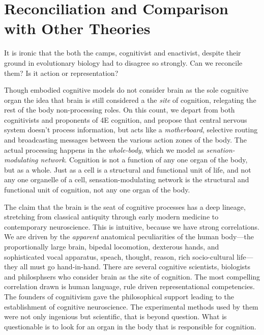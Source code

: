 \section{Reconciliation and Comparison with Other Theories}
\label{sec:comparison}

It is ironic that the both the camps, cognitivist and enactivist, despite their ground in evolutionary biology had to disagree so strongly. Can we reconcile them? Is it action or representation? 

Though embodied cognitive models do not consider brain as the sole cognitive organ\cite{noe_action_2004,OReganNoe2001Sensorimotor,varela1991embodied,clark1997being} the idea that brain is still considered a the \textit{site} of cognition, relegating the rest of the body non-processing roles. On this count, we depart from both cognitivists and proponents of 4E cognition, and propose that central nervous system doesn't process information, but acts like a \textit{motherboard}, selective routing and broadcasting messages between the various action zones of the body. The actual processing happens in the \textit{whole-body}, which we model as \textit{senation-modulating network}.  Cognition is not a function of any one organ of the body, but as a whole.  Just as a cell is a structural and functional unit of life, and not any one organelle of a cell, sensation-modulating network is the structural and functional unit of cognition, not any one organ of the body. 

The claim that the brain is the seat of cognitive processes has a deep lineage, stretching from classical antiquity through early modern medicine to contemporary neuroscience. This is intuitive, because we have strong correlations. We are driven by the \textit{apparent} anatomical peculiarities of the human body—the proportionally large brain, bipedal locomotion, dexterous hands, and sophisticated vocal apparatus, speach, thought, reason, rich socio-cultural life— they all must go hand-in-hand. There are several cognitive scientists, biologists and philosphsers who consider brain as the site of cognition\cite{Gazzaniga2018Consciousness,Churchland2013Touching,Dehaene2014Consciousness,Jackendoff2002Foundations,AdamsAizawa2010Cogs}.  The most compelling correlation drawn is human language, rule driven representational competencies. The founders of cognitivism\cite{chomsky1965aspects,fodor_modularity_1983} gave the philosophical support leading to the establishment of cognitive neuroscience. The experimental methods used by them were not only ingenious but scientific, that is beyond question. What is questionable is to look for an organ in the body that is responsible for cognition. 

